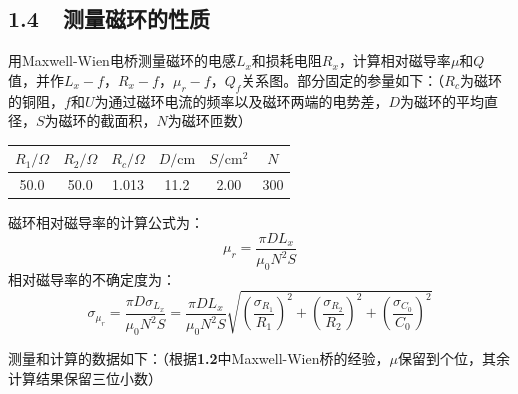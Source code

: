 \documentclass[a4paper,fontset=windows]{ctexart}
\begin{document}
    \subsection*{1.4\ \ 测量磁环的性质}

    用Maxwell-Wien电桥测量磁环的电感$L_x$和损耗电阻$R_x$，计算相对磁导率$\mu$和$Q$值，并作$L_x-f$，$R_x-f$，$\mu_r-f$，$Q_f$关系图。部分固定的参量如下：（$R_c$为磁环的铜阻，$f$和$U$为通过磁环电流的频率以及磁环两端的电势差，$D$为磁环的平均直径，$S$为磁环的截面积，$N$为磁环匝数）

    \begin{center}
    \begin{tabular}{|c|c|c|c|c|c|}
        \hline
        $R_1/\Omega$ & $R_2/\Omega$ & $R_c/\Omega$ & $D/\mathrm{cm}$ & $S/\mathrm{cm^2}$ & $N$ \\
        \hline
        50.0 & 50.0 & 1.013 & 11.2 & 2.00 & 300 \\
        \hline
    \end{tabular}
    \end{center}

    磁环相对磁导率的计算公式为：
    \[
    \mu_r = \frac{\pi DL_x}{\mu_0 N^2 S}
    \]
    相对磁导率的不确定度为：
    \[
    \sigma_{\mu_r} = \frac{\pi D\sigma_{L_x}}{\mu_0 N^2 S} = \frac{\pi DL_x}{\mu_0 N^2 S}\sqrt{\left(\frac{\sigma_{R_1}}{R_1}\right)^2 + \left(\frac{\sigma_{R_2}}{R_2}\right)^2 + \left(\frac{\sigma_{C_0}}{C_0}\right)^2}
    \]

    测量和计算的数据如下：（根据\textbf{1.2}中Maxwell-Wien桥的经验，$\mu$保留到个位，其余计算结果保留三位小数）
\end{document}
